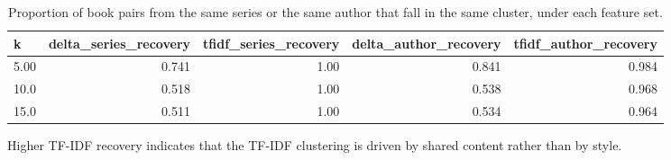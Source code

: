 \begin{table}[htbp]
\centering
\small
\caption{Proportion of book pairs from the same series or the same author that fall in the same cluster, under each feature set.}
\label{tab:method-comparison}
\begin{tabular}{lrrrr}
\toprule
\textbf{k} & \textbf{delta\_series\_recovery} & \textbf{tfidf\_series\_recovery} & \textbf{delta\_author\_recovery} & \textbf{tfidf\_author\_recovery} \\
\midrule
5.00 & 0.741 & 1.00 & 0.841 & 0.984 \\
10.0 & 0.518 & 1.00 & 0.538 & 0.968 \\
15.0 & 0.511 & 1.00 & 0.534 & 0.964 \\
\bottomrule
\end{tabular}
\vspace{0.5em}
\begin{minipage}{\linewidth}\footnotesize Higher TF-IDF recovery indicates that the TF-IDF clustering is driven by shared content rather than by style.\end{minipage}
\end{table}

